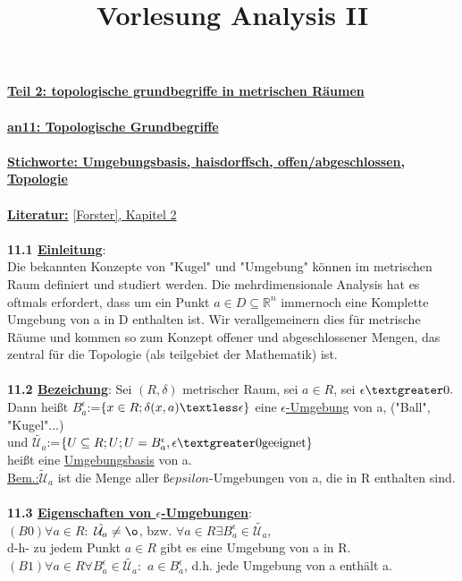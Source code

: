 \documentclass[]{scrartcl}
\title{Vorlesung Analysis II}
\begin{document}
	
	\textbf{\underline{Teil 2: topologische grundbegriffe in metrischen Räumen}}\\
	\\
	\textbf{\underline{an11: Topologische Grundbegriffe}}\\
	\\
	\textbf{\underline{\underline{Stichworte:} Umgebungsbasis, haisdorffsch, offen/abgeschlossen, Topologie}}\\
	\\
	\textbf{\underline{Literatur:}} \ul{[Forster], Kapitel 2}\\
	\\
	
	\textbf{11.1 \underline{Einleitung}}:\\
	Die bekannten Konzepte von "Kugel" und "Umgebung" können im metrischen Raum definiert und studiert werden. Die mehrdimensionale Analysis hat es oftmals erfordert, dass um ein Punkt $a\in D \subseteq\mathbb{R}^n$ immernoch eine Komplette Umgebung von a in D enthalten ist. Wir verallgemeinern dies für metrische Räume und kommen so zum Konzept offener und abgeschlossener Mengen, das zentral für die Topologie (als teilgebiet der Mathematik) ist.\\
	\\
	\textbf{11.2 \underline{Bezeichung}}: Sei $(R,\delta)$ metrischer Raum, sei $a\in R$, sei $\epsilon \textgreater0.$\\
	Dann heißt \ul{$B_a^\epsilon$}:=$\{x\in R; \delta(x,a)\textless \epsilon\}$ eine \ul{$\epsilon$-Umgebung} von a, ("Ball", "Kugel"...)\\
	und \ul{$\tilde{\mathcal{U}_a}$}:=$\{U\subseteq R; U; U = B_a^\epsilon, \epsilon \textgreater 0 \text{geeignet}\}$\\
	heißt eine \ul{Umgebungsbasis} von a.\\
	\underline{Bem.:}$ \tilde{\mathcal{U}}_a$ ist die Menge aller $ßepsilon$-Umgebungen von a, die in R enthalten sind.\\
	\\
	\textbf{11.3 \underline{Eigenschaften von $\epsilon$-Umgebungen}}:\\
	$(B0) \forall a \in R:$ \ul{$\tilde{\mathcal{U}_a}\neq\o$}, bzw. $\forall a \in R \exists B_a^\epsilon\in \tilde{\mathcal{U}_a}$,\\
	d-h- zu jedem Punkt $a\in R$ gibt es eine Umgebung von a in R.\\
	$(B1) \forall a \in R \forall B_a^\epsilon \in \tilde{\mathcal{U}_a}:$ \ul{$a \in B_a^\epsilon$}, d.h. jede Umgebung von a enthält a.\\
\end{document}
